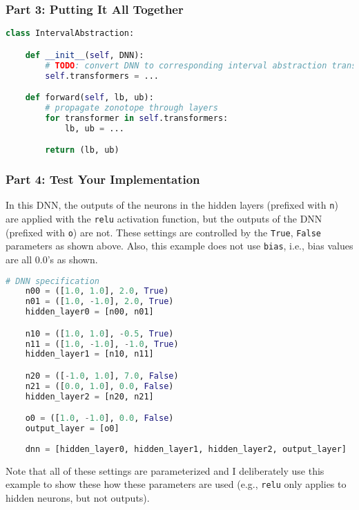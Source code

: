 \subsubsection{Part 3: Putting It All Together}

\begin{lstlisting}[language=Python]
class IntervalAbstraction:

    def __init__(self, DNN):
        # TODO: convert DNN to corresponding interval abstraction transformers
        self.transformers = ...

    def forward(self, lb, ub):
        # propagate zonotope through layers
        for transformer in self.transformers:
            lb, ub = ...

        return (lb, ub)

\end{lstlisting}

\subsubsection{Part 4: Test Your Implementation}

In this DNN, the outputs of the neurons in the hidden layers (prefixed with \texttt{n}) are applied with the \texttt{relu} activation function, but the outputs of the DNN (prefixed with \texttt{o}) are not.  These settings are controlled by the \texttt{True}, \texttt{False} parameters as shown above.  Also, this example does not use \texttt{bias}, i.e., bias values are all 0.0's as shown. 

\begin{lstlisting}[language=Python]
    # DNN specification
    n00 = ([1.0, 1.0], 2.0, True)
    n01 = ([1.0, -1.0], 2.0, True)
    hidden_layer0 = [n00, n01]

    n10 = ([1.0, 1.0], -0.5, True)
    n11 = ([1.0, -1.0], -1.0, True)
    hidden_layer1 = [n10, n11]

    n20 = ([-1.0, 1.0], 7.0, False)
    n21 = ([0.0, 1.0], 0.0, False)
    hidden_layer2 = [n20, n21]

    o0 = ([1.0, -1.0], 0.0, False)
    output_layer = [o0]
    
    dnn = [hidden_layer0, hidden_layer1, hidden_layer2, output_layer]
\end{lstlisting}

Note that all of these settings are parameterized and I deliberately use this example to show these how these parameters are used (e.g., \texttt{relu} only applies to hidden neurons, but not outputs).


